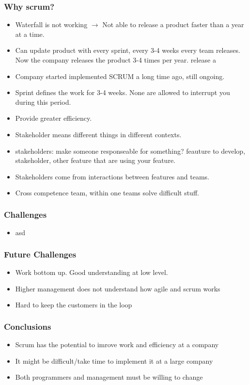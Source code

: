 \documentclass{beamer}
\begin{document}
\begin{frame}
  \frametitle{Why scrum?}
  \begin{itemize}

  \item Waterfall is not working $\rightarrow$ Not able to release a
    product faster than a year at a time.
  \item Can update product with every sprint, every 3-4 weeks every
    team releases. Now the company releases the product 3-4 times per year.
    release a
  \item Company started implemented SCRUM a long time ago, still
    ongoing.
  \item Sprint defines the work for 3-4 weeks. None are allowed to
    interrupt you during this period.
  \item Provide greater efficiency.
  \item Stakeholder means different things in different contexts.
  \item stakeholders: make someone responseable for something?
    feauture to develop, stakeholder, other feature that are using
    your feature.
  \item Stakeholders come from interactions between features and teams.
  \item Cross competence team, within one teams solve difficult stuff.

  \end{itemize}
\end{frame}

\begin{frame}
  \frametitle{Challenges}
  \begin{itemize}
  \item asd
  \end{itemize}
\end{frame}

\begin{frame}
  \frametitle{Future Challenges}
  \begin{itemize}
  \item Work bottom up. Good understanding at low level. 
  \item Higher management does not understand how agile and scrum works
  \item Hard to keep the customers in the loop
  \end{itemize}
\end{frame}

\begin{frame}
  \frametitle{Conclusions}
  \begin{itemize}
  \item Scrum has the potential to imrove work and efficiency at a company
  \item It might be difficult/take time to implement it at a large company
  \item Both programmers and management must be willing to change
  \end{itemize}
\end{frame}
\end{document}
